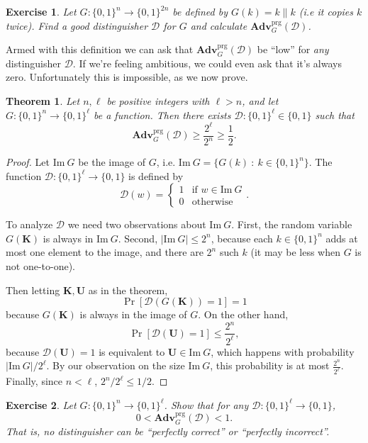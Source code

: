 \documentclass[11pt]{article}
\newtheorem{exercise}{Exercise}
\newtheorem{theorem}{Theorem}
\newcommand{\calD}{\mathcal{D}}
\newcommand{\Adv}{\mathbf{Adv}}
\newcommand{\AdvPRG}[2]{\Adv^{\mathrm{prg}}_{#1}({#2})}
\newcommand{\bits}{\{0,1\}}
\newcommand{\bK}{\mathbf{K}}
\newcommand{\bU}{\mathbf{U}}
\newcommand{\Img}{\mathrm{Im}}
\begin{document}
\begin{exercise}
    Let $G:\bits^n\to\bits^{2n}$ be defined by $G(k)=k\|k$ (i.e it copies
    $k$ twice). Find a good distinguisher $\calD$ for $G$ and calculate
    $\AdvPRG{G}{\calD}$.
\end{exercise}

Armed with this definition we can ask that $\AdvPRG{G}{\calD}$ be ``low''
for \emph{any} distinguisher $\calD$. If we're feeling ambitious, we
could even ask that it's always zero. Unfortunately this is impossible,
as we now prove.
\begin{theorem}
    Let $n,\ell$ be positive integers with $\ell>n$, and let
    $G:\bits^n\to\bits^\ell$ be a function. Then there exists
    $\calD:\bits^\ell\in\bits$ such that
    \[
        \AdvPRG{G}{\calD} \geq \frac{2^\ell}{2^n} \geq \frac{1}{2}.
    \]
\end{theorem}
\begin{proof}
    Let $\Img\ G$ be the image of $G$, i.e. $\Img\ G = \{G(k) \ :\
    k\in\bits^n\}$.  The function $\calD:\bits^\ell\to\bits$ is defined by
    \[
        \calD(w) =
        \begin{cases}
            1 & \text{if $w\in\Img\ G$} \\
            0 & \text{otherwise}
        \end{cases}.
    \]
    
    To analyze $\calD$ we need two observations about $\Img\ G$. First, the
    random variable $G(\bK)$ is always in $\Img\ G$. Second, $|\Img\ G| \leq
    2^n$, because each $k\in\bits^n$ adds at most one element to the image, and
    there are $2^n$ such $k$ (it may be less when $G$ is not one-to-one).

    Then letting $\bK,\bU$ as in the theorem,
    \[
        \Pr[\calD(G(\bK))=1]=1
    \]
    because $G(\bK)$ is always in the image of $G$. On the other hand,
    \[
        \Pr[\calD(\bU)=1] \leq \frac{2^n}{2^\ell},
    \]
    because $\calD(\bU)=1$ is equivalent to $\bU\in\Img\ G$, which happens
    with probability $|\Img\ G|/2^\ell$. By our observation on the size
    $\Img\ G$, this probability is at most $\frac{2^n}{2^\ell}$. Finally,
    since $n<\ell$, $2^n/2^\ell \leq 1/2$.
\end{proof}

\begin{exercise}
    Let $G:\bits^n\to\bits^\ell$. Show that for \emph{any}
    $\calD:\bits^\ell\to\bits$,
    \[
        0 < \AdvPRG{G}{\calD} < 1.
    \]
    That is, no distinguisher can be ``perfectly correct'' or ``perfectly
    incorrect''.
\end{exercise}
\end{document}
